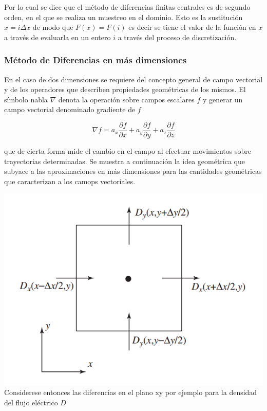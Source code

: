 \documentclass[]{article}
\begin{document}
Por lo cual se dice que el método de diferencias finitas centrales es de
segundo orden, en el que se realiza un muestreo en el dominio. Esto es
la sustitución \(x = i \Delta x\) de modo que \(F(x) = F(i)\) es decir
se tiene el valor de la función en \(x\) a través de evaluarla en un
entero \(i\) a través del proceso de discretización.

\subsubsection{Método de Diferencias en más
dimensiones}\label{metodo-de-diferencias-en-mas-dimensiones}

En el caso de dos dimensiones se requiere del concepto general de campo
vectorial y de los operadores que describen propiedades geométricas de
los mismos. El símbolo nabla \(\nabla\) denota la operación sobre campos
escalares \(f\) y generar un campo vectorial denominado gradiente de
\(f\)

\begin{equation}
\nabla f = a_x \frac{\partial f}{\partial x} + a_y \frac{\partial f}{\partial y} +a_z \frac{\partial f}{\partial z}
\end{equation}

que de cierta forma mide el cambio en el campo al efectuar movimientos
sobre trayectorias determinadas. Se muestra a continuación la idea
geométrica que subyace a las aproximaciones en más dimensiones para las
cantidades geométricas que caracterizan a los camops vectoriales.

\includegraphics{img/divergence.png} Considerese entonces las
diferencias en el plano xy por ejemplo para la densidad del flujo
eléctrico \(D\)
\end{document}
